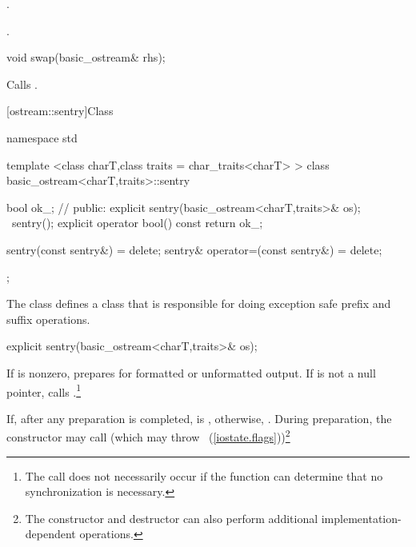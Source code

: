 \begin{itemdescr}
\pnum
\effects {}.

\pnum
\returns {}.
\end{itemdescr}

%
%
\begin{itemdecl}
void swap(basic_ostream& rhs);
\end{itemdecl}

\begin{itemdescr}
\pnum
\effects Calls .
\end{itemdescr}

[ostream::sentry]{Class }

%
\begin{codeblock}
namespace std {
  template <class charT,class traits = char_traits<charT> >
  class basic_ostream<charT,traits>::sentry {
    bool ok_; // \exposr
  public:
    explicit sentry(basic_ostream<charT,traits>& os);
    ~sentry();
    explicit operator bool() const { return ok_; }

    sentry(const sentry&) = delete;
    sentry& operator=(const sentry&) = delete;
  };
}
\end{codeblock}

\pnum
The class
defines a class that is responsible for doing exception safe prefix and suffix
operations.

%
\begin{itemdecl}
explicit sentry(basic_ostream<charT,traits>& os);
\end{itemdecl}

\begin{itemdescr}
\pnum
If
is nonzero, prepares for formatted or unformatted output.
If
is not a null pointer, calls
%
.\footnote{The call
does not necessarily occur if the function can determine that no
synchronization is necessary.}

\pnum
If, after any preparation is completed,
is
,
otherwise,
.
During preparation, the constructor may call
(which may throw
~(\ref{iostate.flags}))\footnote{The
constructor and destructor
can also perform additional
implementation-dependent operations.}
\end{itemdescr}

